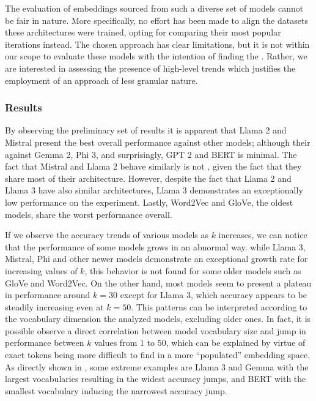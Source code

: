 
The evaluation of embeddings sourced from such a diverse set of models cannot be fair in nature.
More specifically, no effort has been made to align the datasets  these architectures were trained, opting for comparing their most popular iterations instead.
The chosen approach has clear limitations, but it is not within our scope to evaluate these models with the intention of finding the .
Rather, we are interested in assessing the presence of high-level trends which justifies the employment of an approach of less granular nature.

\subsubsection{Results}


By observing the preliminary set of results it is apparent that Llama 2 and Mistral present the best overall performance against other models; although their  against Gemma 2, Phi 3, and surprisingly, GPT 2 and BERT is minimal.
The fact that Mistral and Llama 2 behave similarly is not , given the fact that they share most of their architecture.
However, despite the fact that Llama 2 and Llama 3 have also similar architectures, Llama 3 demonstrates an exceptionally low performance on the experiment.
Lastly, Word2Vec and GloVe, the oldest models, share the worst performance overall.


If we observe the accuracy trends of various models as $k$ increases, we can notice that the performance of some models grows in an abnormal way.
 while Llama 3, Mistral, Phi and other newer models demonstrate an exceptional growth rate for increasing values of $k$, this behavior is not found for some older models such as GloVe and Word2Vec.
On the other hand, most models seem to present a plateau in performance around $k = 30$ except for Llama 3, which accuracy appears to be steadily increasing even at $k = 50$.
This patterns can be interpreted according to the vocabulary dimension the analyzed models, excluding older ones.
In fact, it is possible observe a direct correlation between model vocabulary size and jump in performance between $k$ values from $1$ to $50$, which can be explained by virtue of exact tokens being more difficult to find in a more ``populated'' embedding space.
As directly shown in , some extreme examples are Llama 3 and Gemma with the largest vocabularies resulting in the widest accuracy jumps, and BERT with the smallest vocabulary inducing the narrowest accuracy jump.

